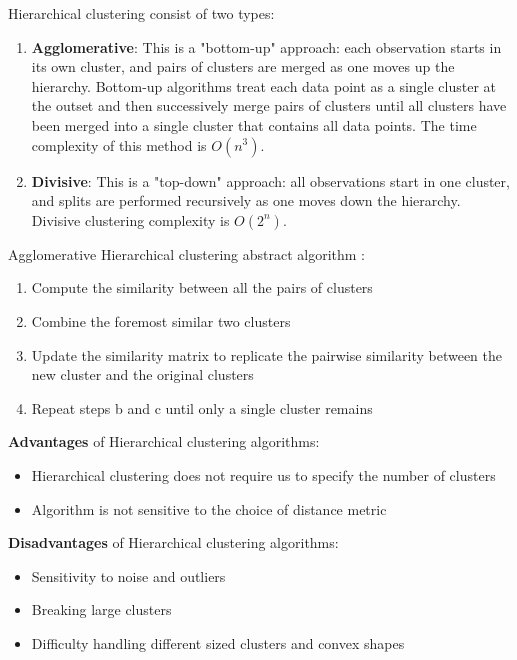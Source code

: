 \begin{enumerate}
   
   Hierarchical clustering consist of two types:
   \begin{enumerate}
       \item \textbf{Agglomerative}:  This is a "bottom-up" approach: each observation starts in its own cluster, and pairs of clusters are merged as one moves up the hierarchy. Bottom-up algorithms treat each data point as a single cluster at the outset and then successively merge  pairs of clusters until all clusters have been merged into a single cluster that contains all data points. The time complexity of this method is $O(n^3)$.
       \item \textbf{Divisive}: This is a "top-down" approach: all observations start in one cluster, and splits are performed recursively as one moves down the hierarchy. Divisive clustering complexity is $O(2^n)$. 
   \end{enumerate}
    
    
    Agglomerative Hierarchical clustering abstract algorithm \cite{BIB11}:
    \begin{enumerate}
        \item Compute the similarity between all the pairs of clusters
        \item Combine the foremost similar two clusters
        \item Update the similarity matrix to replicate the pairwise similarity between the new cluster and the original clusters
        \item Repeat steps b and c until only a single cluster remains
    \end{enumerate}
    
    
    \textbf{Advantages} of Hierarchical clustering algorithms:
    \begin{itemize}
        \item Hierarchical clustering does not require us to specify the number of clusters
        \item Algorithm is not sensitive to the choice of distance metric
    \end{itemize}
    
    
    \textbf{Disadvantages} of Hierarchical clustering algorithms:
    \begin{itemize}
        \item Sensitivity to noise and outliers
        \item Breaking large clusters
        \item Difficulty handling different sized clusters and convex shapes
    \end{itemize}
    
\end{enumerate}


